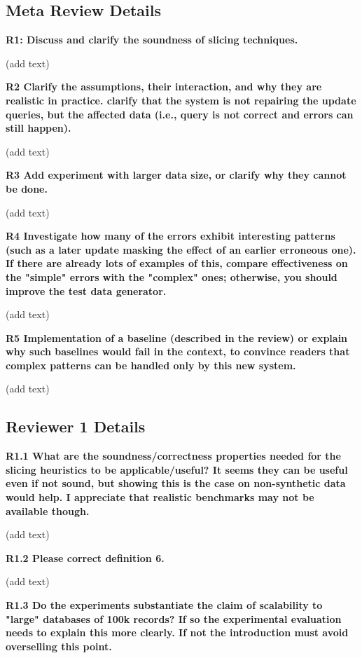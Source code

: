 \documentclass{vldb}
\begin{document}
\subsection*{Meta Review Details}
\noindent \textbf{R1: Discuss and clarify the soundness of slicing techniques.}

(add text)

\noindent \textbf{R2 Clarify the assumptions, their interaction, and why they are realistic in practice. clarify that the system is not repairing the update queries, but the affected data (i.e., query is not correct and errors can still happen).}

(add text)

\noindent \textbf{R3 Add experiment with larger data size, or clarify why they cannot be done.}

(add text)

\noindent \textbf{R4 Investigate how many of the errors exhibit interesting patterns (such as a later update masking the effect of an earlier erroneous one). If there are already lots of examples of this, compare effectiveness on the "simple" errors with the "complex" ones; otherwise, you should improve the test data generator.}

(add text)

\noindent \textbf{R5 Implementation of a baseline (described in the review) or explain why such baselines would fail in the context, to convince readers that complex patterns can be handled only by this new system.}

(add text)
\subsection*{Reviewer 1 Details}
\noindent \textbf{R1.1 What are the soundness/correctness properties needed for the slicing heuristics to be applicable/useful? It seems they can be useful even if not sound, but showing this is the case on non-synthetic data would help. I appreciate that realistic benchmarks may not be available though.}

(add text)

\noindent \textbf{R1.2 Please correct definition 6.}

(add text)

\noindent \textbf{R1.3 Do the experiments substantiate the claim of scalability to "large" databases of 100k records? If so the experimental evaluation needs to explain this more clearly. If not the introduction must avoid overselling this point.}
\end{document}
